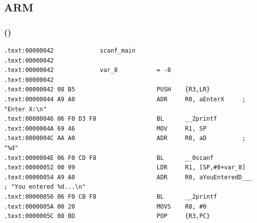 \subsection{ARM}

\subsubsection{\OptimizingKeilVI (\ThumbMode)}

\begin{lstlisting}
.text:00000042             scanf_main
.text:00000042
.text:00000042             var_8           = -8
.text:00000042
.text:00000042 08 B5                       PUSH    {R3,LR}
.text:00000044 A9 A0                       ADR     R0, aEnterX     ; "Enter X:\n"
.text:00000046 06 F0 D3 F8                 BL      __2printf
.text:0000004A 69 46                       MOV     R1, SP
.text:0000004C AA A0                       ADR     R0, aD          ; "%d"
.text:0000004E 06 F0 CD F8                 BL      __0scanf
.text:00000052 00 99                       LDR     R1, [SP,#8+var_8]
.text:00000054 A9 A0                       ADR     R0, aYouEnteredD___ ; "You entered %d...\n"
.text:00000056 06 F0 CB F8                 BL      __2printf
.text:0000005A 00 20                       MOVS    R0, #0
.text:0000005C 08 BD                       POP     {R3,PC}
\end{lstlisting}

